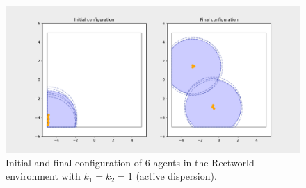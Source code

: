 \begin{figure}[H]
  \centering
  \includegraphics[width=\textwidth]{figs/bigworld_6_agnt_k_1_1_k_2_1_distr.pdf}
  \caption{Initial and final configuration of 6 agents in the Rectworld environment with $k_{1} = k_{2} = 1$ (active dispersion).}
  \label{fig:6_agnt_bw_k_1_1_k_2_1_distr}
\end{figure}
